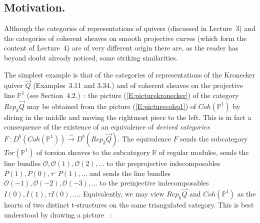 \documentclass[a4paper,10pt]{amsart}
\def\O{\mathcal{O}}
\numberwithin{equation}{section}
\begin{document}
{\vspace{.2in}

\subsection{Motivation.}

\vspace{.15in}

 Although the categories of representations of quivers (discussed in Lecture~3) and the categories of coherent sheaves on smooth projective curves (which form the content of Lecture~4) are of very different origin there are, as the reader has beyond doubt already noticed, some striking similarities.

 The simplest example is that of the categories of representations of the Kronecker quiver $\vec{Q}$ (Examples~3.11 and 3.34.) and of coherent sheaves on the projective line $\mathbb{P}^1$ (see Section~4.2.)~: the picture (\ref{E:picturekronecker}) of the category $Rep_k\vec{Q}$ may be obtained from the picture (\ref{E:picturecohp1}) of $Coh(\mathbb{P}^1)$ by slicing in the middle and moving the rightmost piece to the left. This is in fact a consequence of the existence of an equivalence of \textit{derived categories} $F~:D^b(Coh(\mathbb{P}^1)) \stackrel{\sim}{\to}D^b(Rep_k\vec{Q})$. The equivalence $F$ sends the subcategory $Tor(\mathbb{P}^1)$ of torsion sheaves to the subcategory $\mathbb{R}$ of regular modules, sends the line bundles $\O,\O(1), \O(2),\ldots$ to the preprojective indecomposables $P(1),P(0),\tau^-P(1),\ldots$ and sends the line bundles $\O(-1),\O(-2),\O(-3), \ldots$ to the preinjective indecomposables $I(0),I(1), \tau I(0),\ldots$. Equivalently, we may view $Rep_k\vec{Q}$ and $Coh(\mathbb{P}^1)$ as the hearts of two distinct t-structures on the same triangulated category. This is best understood by drawing a picture ~:

\vspace{.2in}

}
\end{document}
